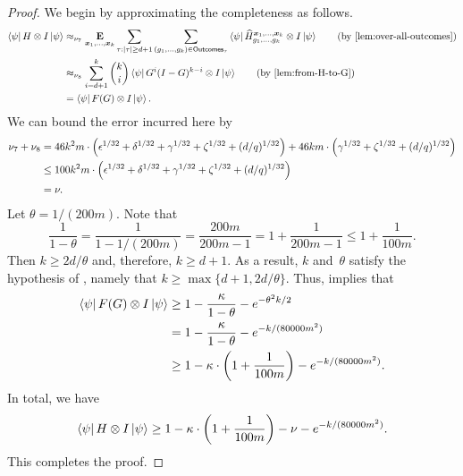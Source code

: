 \begin{proof}
We begin by approximating the completeness as follows.
\begin{align*}
\bra{\psi} H \otimes I \ket{\psi}
& \approx_{\nu_7} \E_{\bx_1, \ldots, \bx_k} \sum_{\tau:|\tau| \geq d+1} \sum_{(g_1, \ldots, g_k) \in \mathsf{Outcomes}_{\tau}} \bra{\psi} \widehat{H}^{\bx_1, \ldots, \bx_k}_{g_1, \ldots, g_k} \otimes I \ket{\psi} \tag{by \Cref{lem:over-all-outcomes}}\\
& \approx_{\nu_8} \sum_{i = d+1}^k \binom{k}{i} \bra{\psi} G^i (I-G)^{k-i} \otimes I \ket{\psi} \tag{by \Cref{lem:from-H-to-G}}\\
& = \bra{\psi} F(G) \ot I \ket{\psi}.
\end{align*}
We can bound the error incurred here by
\begin{align*}
\nu_7 + \nu_8
&= 46 k^2m \cdot \left(\epsilon^{1/32} + \delta^{1/32} +  \gamma^{1/32} + \zeta^{1/32} +(d/q)^{1/32}\right)
	+ 46 k m \cdot \left(\gamma^{1/32} + \zeta^{1/32} + (d/q)^{1/32}\right)\\
&\leq 100 k^2m \cdot \left(\epsilon^{1/32} + \delta^{1/32} +  \gamma^{1/32} + \zeta^{1/32} +(d/q)^{1/32}\right)\\
&= \nu.
\end{align*}
Let $\theta = 1/(200 m)$. Note that
\begin{equation*}
\frac{1}{1-\theta}
= \frac{1}{1- 1/(200m)}
= \frac{200m}{200m-1}
= 1 + \frac{1}{200m-1}
\leq 1 + \frac{1}{100m}.
\end{equation*}
Then $k \geq 2d/\theta$ and, therefore, $k \geq d+1$.
As a result, $k$ and~$\theta$ satisfy the hypothesis of ,
namely that $k \geq \max\{d+1, 2d/\theta\}$.
Thus,  implies that
\begin{align*}
\bra{\psi} F(G) \otimes I \ket{\psi}
&\geq 1 - \frac{\kappa}{1 - \theta}
    - e^{-\theta^2 k/2}\\
&= 1 - \frac{\kappa}{1 - \theta}
    - e^{- k/(80000m^2)}\\
&\geq 1 - \kappa \cdot \left(1 + \frac{1}{100m}\right)
    - e^{- k/(80000m^2)}.
\end{align*}
In total, we have
\begin{equation*}
\bra{\psi} H \otimes I \ket{\psi}
\geq 1 - \kappa \cdot \left(1 + \frac{1}{100m}\right)
    - \nu - e^{- k/(80000m^2)}.
\end{equation*}
This completes the proof.
\end{proof}
